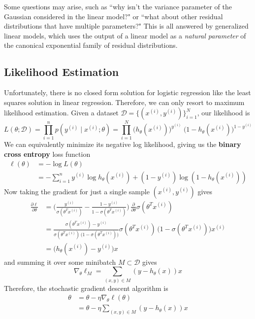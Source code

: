 \documentclass{article}
\theoremstyle{definition}
\begin{document}
  Some questions may arise, such as ``why isn't the variance parameter of the Gaussian considered in the linear model?" or ``what about other residual distributions that have multiple parameters?" This is all answered by generalized linear models, which uses the output of a linear model as a \textit{natural parameter} of the canonical exponential family of residual distributions. 

  \subsection{Likelihood Estimation}

  Unfortunately, there is no closed form solution for logistic regression like the least squares solution in linear regression. Therefore, we can only resort to maximum likelihood estimation. Given a dataset $\mathcal{D} = \{(x^{(i)}, y^{(i)})\}_{i=1}^N$, our likelihood is 
  \[L(\theta ; \mathcal{D}) = \prod_{i=1}^n p(y^{(i)} \;|\; x^{(i)} ; \theta) = \prod_{i=1}^N  \big( h_\theta (x^{(i)} )\big)^{y^{(i)}} \; \big( 1 - h_\theta (x^{(i)})\big)^{1-y^{(i)}}\]
  We can equivalently minimize its negative log likelihood, giving us the \textbf{binary cross entropy} loss function
  \begin{align*}
      \ell(\theta) & = -\log L(\theta) \\
      & = -\sum_{i=1}^n y^{(i)} \log h_\theta (x^{(i)}) + (1 - y^{(i)}) \log (1 - h_\theta (x^{(i)}))
  \end{align*}
  Now taking the gradient for just a single sample $(x^{(i)}, y^{(i)})$ gives 
  \begin{align*}
      \frac{\partial \ell}{\partial \theta}  & = \bigg( \frac{y^{(i)}}{\sigma(\theta^T x^{(i)})} - \frac{1 - y^{(i)}}{1 - \sigma(\theta^T x^{(i)})} \bigg) \, \frac{\partial}{\partial \theta} \sigma (\theta^T x^{(i)}) \\
      & = \frac{\sigma(\theta^T x^{(i)}) - y^{(i)}}{\sigma(\theta^T x^{(i)}) \, \big( 1 - \sigma(\theta^T x^{(i)}) \big)} \sigma(\theta^T x^{(i)}) \, \big( 1 - \sigma(\theta^T x^{(i)}) \big) x^{(i)} \\
      & = \big( h_\theta (x^{(i)}) - y^{(i)} \big) x
  \end{align*}
  and summing it over some minibatch $M \subset \mathcal{D}$ gives 
  \[\nabla_\theta \ell_M = \sum_{(x, y) \in M} (y - h_\theta(x)) x\]
  Therefore, the stochastic gradient descent algorithm is 
  \begin{align*}
      \theta & = \theta - \eta \nabla_\theta \ell (\theta) \\
      & = \theta - \eta \sum_{(x, y) \in M} (y - h_\theta(x)) x
  \end{align*}
\end{document}
